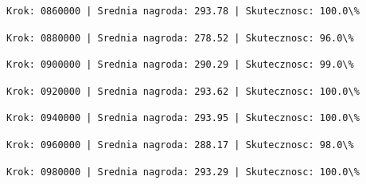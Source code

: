 \documentclass[11pt]{article}
\begin{document}
    
    
    \begin{Verbatim}[commandchars=\\\{\}]
Krok: 0860000 | Srednia nagroda: 293.78 | Skutecznosc: 100.0\%

    \end{Verbatim}

    
    
    \begin{Verbatim}[commandchars=\\\{\}]
Krok: 0880000 | Srednia nagroda: 278.52 | Skutecznosc: 96.0\%

    \end{Verbatim}

    
    
    \begin{Verbatim}[commandchars=\\\{\}]
Krok: 0900000 | Srednia nagroda: 290.29 | Skutecznosc: 99.0\%

    \end{Verbatim}

    
    
    \begin{Verbatim}[commandchars=\\\{\}]
Krok: 0920000 | Srednia nagroda: 293.62 | Skutecznosc: 100.0\%

    \end{Verbatim}

    
    
    \begin{Verbatim}[commandchars=\\\{\}]
Krok: 0940000 | Srednia nagroda: 293.95 | Skutecznosc: 100.0\%

    \end{Verbatim}

    
    
    \begin{Verbatim}[commandchars=\\\{\}]
Krok: 0960000 | Srednia nagroda: 288.17 | Skutecznosc: 98.0\%

    \end{Verbatim}

    
    
    \begin{Verbatim}[commandchars=\\\{\}]
Krok: 0980000 | Srednia nagroda: 293.29 | Skutecznosc: 100.0\%

    \end{Verbatim}
\end{document}
